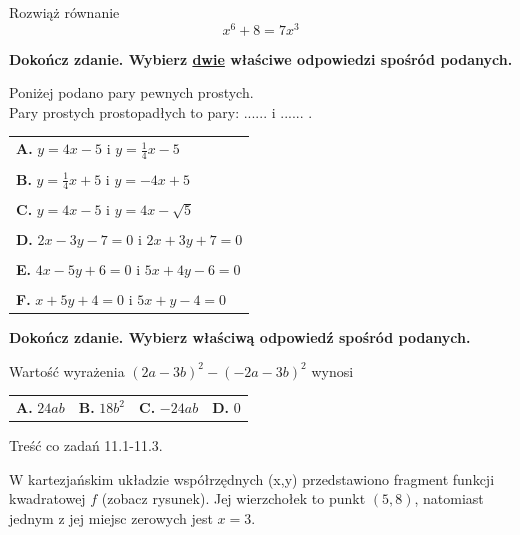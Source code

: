 \documentclass[12pt,a4paper]{article}
\theoremstyle{break}
\begin{document}
	\begin{zad}[0-3]
		Rozwiąż równanie
		$$x^6+8=7x^3$$
	\end{zad} 

	\begin{zad}[0-2]
		\textbf{Dokończ zdanie. Wybierz \underline{dwie} właściwe odpowiedzi spośród podanych.}
	\end{zad} 

	Poniżej podano pary pewnych prostych.
	\\
	
	Pary prostych prostopadłych to pary: ...... i ...... .
	
	\vspace{0.5cm}
	\begin{tabular}{p{14cm}}
		\textbf{A. }$y=4x-5$ i $y=\frac{1}{4}x-5$\\
		\\
		\textbf{B. }$y=\frac{1}{4}x+5$ i $y=-4x+5$\\
		\\
		\textbf{C. }$y=4x-5$ i $y=4x-\sqrt{5}$\\
		\\
		\textbf{D. }$2x-3y-7=0$ i $2x+3y+7=0$\\
		\\
		\textbf{E. }$4x-5y+6=0$ i $5x+4y-6=0$\\
		\\
		\textbf{F. }$x+5y+4=0$ i $5x+y-4=0$\\
	\end{tabular}
		
		
		\begin{zad}[0-1]
			\textbf{Dokończ zdanie. Wybierz właściwą odpowiedź spośród podanych.}
		\end{zad} 
		
		Wartość wyrażenia $(2a-3b)^2-(-2a-3b)^2$ wynosi
		
		\vspace{0.5cm}
		\begin{tabular}{p{3.5cm} p{3.5cm} p{3.5cm} p{3.5cm}}
			\textbf{A. }$24ab$&
			\textbf{B. }$18b^2$&
			\textbf{C. }$-24ab$&
			\textbf{D. }$0$\\
		\end{tabular}
	
		\newpage
		\begin{zad}
			Treść co zadań 11.1-11.3.
		\end{zad}
	
		W kartezjańskim układzie współrzędnych (x,y) przedstawiono fragment funkcji kwadratowej $f$ (zobacz rysunek). Jej wierzchołek to punkt $(5,8)$, natomiast jednym z jej miejsc zerowych jest $x=3$.
		
\end{document}
